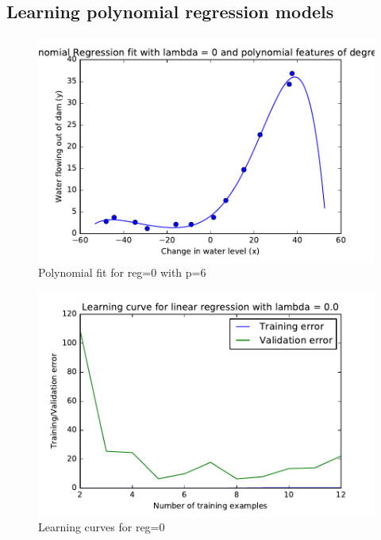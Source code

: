 \documentclass[pdftex,11pt]{article}
\begin{document}
\subsection{Learning polynomial regression models}
\begin{figure}[H]
  \caption{Polynomial fit for reg=0 with p=6}
  \centering
    \includegraphics[scale=1]{fig9.pdf}
\end{figure}
\begin{figure}[H]
  \caption{Learning curves for reg=0}
  \centering
    \includegraphics[scale=1]{fig10.pdf}
\end{figure}
\end{document}
